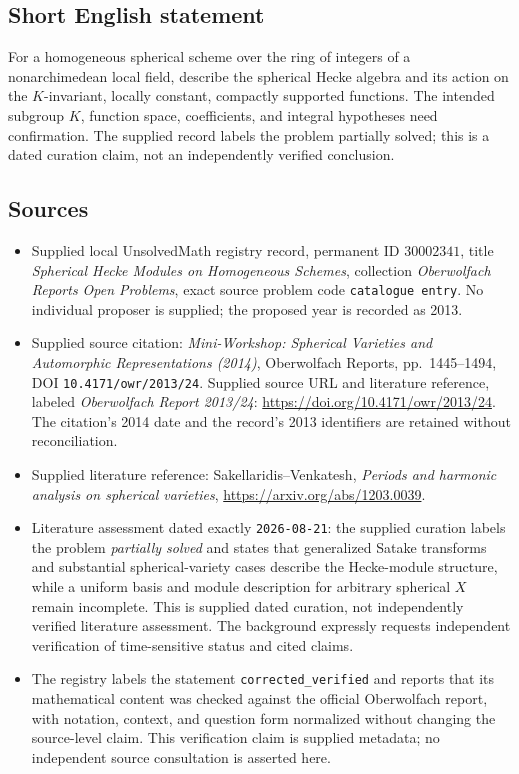\documentclass[11pt]{article}
\begin{document}
\subsection{Short English statement}
For a homogeneous spherical scheme over the ring of integers of a nonarchimedean local field, describe the spherical Hecke algebra and its action on the \(K\)-invariant, locally constant, compactly supported functions. The intended subgroup \(K\), function space, coefficients, and integral hypotheses need confirmation. The supplied record labels the problem partially solved; this is a dated curation claim, not an independently verified conclusion.
\subsection{Sources}
\begin{itemize}
\item Supplied local UnsolvedMath registry record, permanent ID \(30002341\), title \emph{Spherical Hecke Modules on Homogeneous Schemes}, collection \emph{Oberwolfach Reports Open Problems}, exact source problem code \texttt{catalogue entry}. No individual proposer is supplied; the proposed year is recorded as 2013.
\item Supplied source citation: \emph{Mini-Workshop: Spherical Varieties and Automorphic Representations (2014)}, Oberwolfach Reports, pp.\ 1445--1494, DOI \texttt{10.4171/owr/2013/24}. Supplied source URL and literature reference, labeled \emph{Oberwolfach Report 2013/24}: \url{https://doi.org/10.4171/owr/2013/24}. The citation's 2014 date and the record's 2013 identifiers are retained without reconciliation.
\item Supplied literature reference: Sakellaridis--Venkatesh, \emph{Periods and harmonic analysis on spherical varieties}, \url{https://arxiv.org/abs/1203.0039}.
\item Literature assessment dated exactly \texttt{2026-08-21}: the supplied curation labels the problem \emph{partially solved} and states that generalized Satake transforms and substantial spherical-variety cases describe the Hecke-module structure, while a uniform basis and module description for arbitrary spherical \(X\) remain incomplete. This is supplied dated curation, not independently verified literature assessment. The background expressly requests independent verification of time-sensitive status and cited claims.
\item The registry labels the statement \texttt{corrected\_verified} and reports that its mathematical content was checked against the official Oberwolfach report, with notation, context, and question form normalized without changing the source-level claim. This verification claim is supplied metadata; no independent source consultation is asserted here.
\end{itemize}
\end{document}
